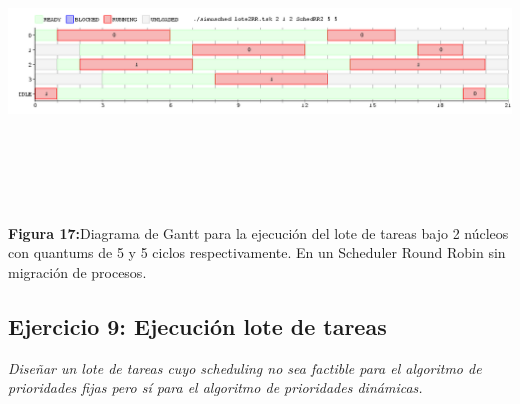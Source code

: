 \documentclass[a4paper]{article}
\begin{document}
\includegraphics[width=\textwidth,height=3.0in,keepaspectratio
]{imagenes/ej8/2eje6.png} \\
\begin {flushleft}
\textbf{Figura 17:}Diagrama de Gantt para la ejecuci\'on del lote de tareas bajo 2 n\'ucleos con quantums de 5 y 5 ciclos respectivamente. En un Scheduler Round Robin sin migración de procesos.
\end{flushleft}	
 
\newpage
 \subsection{Ejercicio 9:  Ejecuci\'on lote de tareas}
\textit{Dise\~nar un lote de tareas cuyo scheduling no sea factible para el algoritmo de prioridades fijas pero s\'i para el algoritmo de prioridades din\'amicas.}
\end{document}
